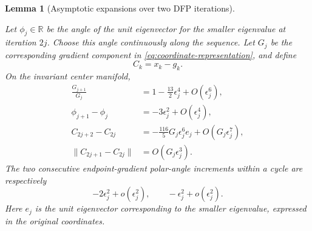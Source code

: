 \documentclass[11pt]{article}
\newtheorem{lemma}[theorem]{Lemma}
\newcommand{\R}{\mathbb R}
\begin{document}
\begin{lemma}[Asymptotic expansions over two DFP iterations]\label{lem:two-step-expansions}







Let $\phi_j\in\R$ be the angle of the unit eigenvector for the smaller
eigenvalue at iteration $2j$.  Choose this angle continuously along the
sequence.  Let $G_j$ be the corresponding gradient component in
\eqref{eq:coordinate-representation}, and define
\[
C_k=x_k-g_k.
\]
On the invariant center manifold,
\begin{align}
\frac{G_{j+1}}{G_j}
&=1-\frac{13}{2}\epsilon_j^4+O(\epsilon_j^6),
\label{eq:G-map}\\
\phi_{j+1}-\phi_j
&=-3\epsilon_j^2+O(\epsilon_j^4),
\label{eq:phi-map}\\
C_{2j+2}-C_{2j}
&=-\frac{116}{5}G_j\epsilon_j^6e_j
+O(G_j\epsilon_j^7),
\label{eq:C-map}\\
\|C_{2j+1}-C_{2j}\|&=O(G_j\epsilon_j^3).
\label{eq:C-half}
\end{align}
The two consecutive endpoint-gradient polar-angle increments within a cycle are
respectively
\begin{equation}\label{eq:half-angles}
-2\epsilon_j^2+o(\epsilon_j^2),
\qquad -\epsilon_j^2+o(\epsilon_j^2).
\end{equation}
Here $e_j$ is the unit eigenvector corresponding to the smaller eigenvalue,
expressed in the original coordinates.
\end{lemma}
\end{document}
